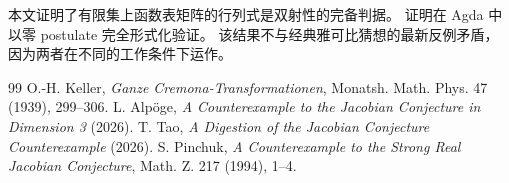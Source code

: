 \documentclass[a4paper,11pt]{article}
\theoremstyle{remark}
\begin{document}
本文证明了有限集上函数表矩阵的行列式是双射性的完备判据。
证明在 Agda 中以零 postulate 完全形式化验证。
该结果不与经典雅可比猜想的最新反例矛盾，
因为两者在不同的工作条件下运作。

\begin{thebibliography}{99}
 O.-H. Keller, \textit{Ganze Cremona-Transformationen}, Monatsh. Math. Phys. 47 (1939), 299--306.
 L. Alp\"{o}ge, \textit{A Counterexample to the Jacobian Conjecture in Dimension 3} (2026).
 T. Tao, \textit{A Digestion of the Jacobian Conjecture Counterexample} (2026).
 S. Pinchuk, \textit{A Counterexample to the Strong Real Jacobian Conjecture}, Math. Z. 217 (1994), 1--4.
\end{thebibliography}
\end{document}
